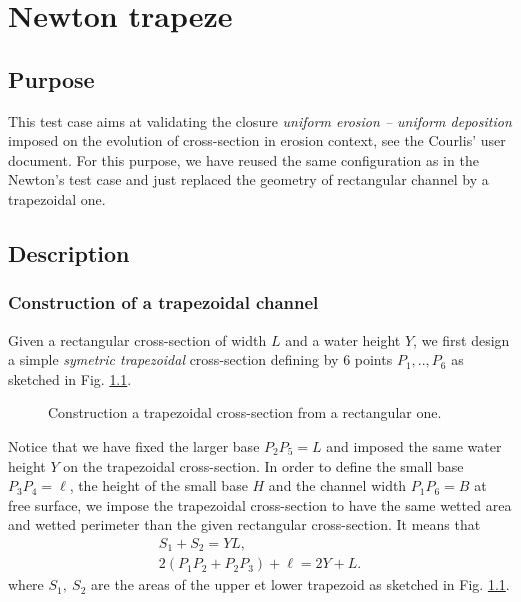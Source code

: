 \chapter{Newton trapeze}\label{chapter:Newton_trapeze}

\section{Purpose}

This test case aims at validating the closure {\em uniform erosion -- uniform deposition}
imposed on the evolution of cross-section in erosion context, see the Courlis' user document.
For this purpose, we have reused the same configuration as in the Newton's test case
and just replaced the geometry of rectangular channel by a trapezoidal one.

\section{Description}

\subsection{Construction of a trapezoidal channel}

Given a rectangular cross-section of width $L$ and a water height $Y$, we first
design a simple {\em symetric trapezoidal} cross-section defining by 6 points $P_1,..,P_6$
as sketched in Fig. \ref{newton_trapeze:fig:rectangle_to_trapeze}.

\begin{figure}[!ht]
 \centering
 \caption{Construction a trapezoidal cross-section from a rectangular one.}
 \label{newton_trapeze:fig:rectangle_to_trapeze}
\end{figure}

Notice that we have fixed the larger base $P_2P_5 = L$ and imposed the same water
height $Y$ on the trapezoidal cross-section. In order to define the small base
$P_3P_4=\ell$, the height of the small base $H$ and the channel width $P_1P_6 = B$ at free surface,
we impose the trapezoidal cross-section to have the same wetted area and wetted
perimeter than the given rectangular cross-section. It means that
\begin{gather}
  S_1 + S_2 = YL, \label{newton_trapeze:wetted-area}\\
  2(P_1P_2 + P_2P_3) + \ell = 2Y + L. \label{newton_trapeze:wetted-perimeter}
\end{gather}
where $S_1, ~ S_2$ are the areas of the upper et lower trapezoid as sketched in Fig. \ref{newton_trapeze:fig:rectangle_to_trapeze}.

